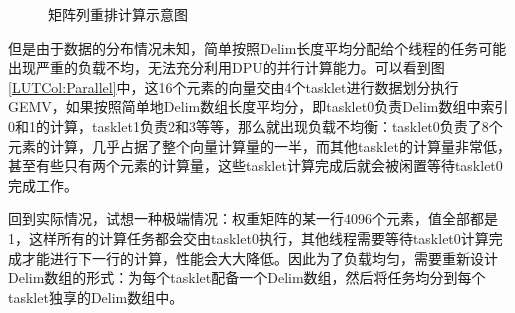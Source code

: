 \begin{figure}[htbp!]
	\centering
	\label{LUTCol}
	\caption{矩阵列重排计算示意图}
\end{figure}

但是由于数据的分布情况未知，简单按照Delim长度平均分配给个线程的任务可能出现严重的负载不均，无法充分利用DPU的并行计算能力。可以看到图\ref{LUTCol:Parallel}中，这16个元素的向量交由4个tasklet进行数据划分执行GEMV，如果按照简单地Delim数组长度平均分，即tasklet0负责Delim数组中索引0和1的计算，tasklet1负责2和3等等，那么就出现负载不均衡：tasklet0负责了8个元素的计算，几乎占据了整个向量计算量的一半，而其他tasklet的计算量非常低，甚至有些只有两个元素的计算量，这些tasklet计算完成后就会被闲置等待tasklet0完成工作。

回到实际情况，试想一种极端情况：权重矩阵的某一行4096个元素，值全部都是1，这样所有的计算任务都会交由tasklet0执行，其他线程需要等待tasklet0计算完成才能进行下一行的计算，性能会大大降低。因此为了负载均匀，需要重新设计Delim数组的形式：为每个tasklet配备一个Delim数组，然后将任务均分到每个tasklet独享的Delim数组中。

